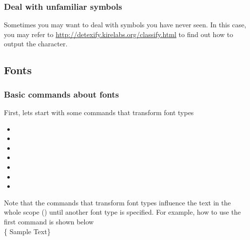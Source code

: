 \begin{frame}
    \frametitle{Deal with unfamiliar symbols}
    Sometimes you may want to deal with symbols you have never seen. In this case, you may refer to \url{http://detexify.kirelabs.org/classify.html} to find out how to output the character.
\end{frame}

\subsection{Fonts}

\begin{frame}
    \frametitle{Basic commands about fonts}
    First, lets start with some commands that transform font types
    \pause
    \begin{itemize}
        \item {}
        \item {}
        \item {}
        \item {}
        \item {}
        \item {}
        \item {}
    \end{itemize}
    \pause
    Note that the commands that transform font types influence the text in the whole scope () until another font type is specified. For example, how to use the first command  is shown below\\[0.5em]
    \{ Sample Text\}
\end{frame}

